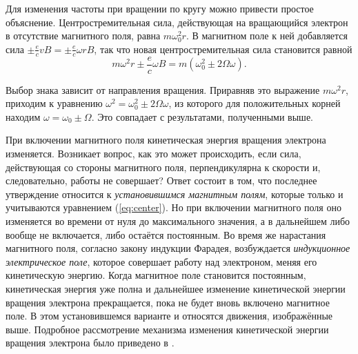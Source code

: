 \documentclass[12pt]{article}
\begin{document}
  Для изменения частоты при вращении по кругу можно привести простое объяснение. Центростремительная сила, действующая на вращающийся электрон в отсутствие магнитного поля, равна $m \omega_0^2 r$. В магнитном поле к ней добавляется сила $\pm \frac{e}{c} v B = \pm \frac{e}{c} \omega r B$, так что новая центростремительная сила становится равной
  \[
  m \omega^2 r \pm \frac{e}{c} \omega B = m (\omega_0^2 \pm 2\Omega \omega).
  \]

  Выбор знака зависит от направления вращения. Приравняв это выражение $m \omega^2 r$, приходим к уравнению $\omega^2 = \omega_0^2 \pm 2\Omega \omega$, из которого для положительных корней находим $\omega = \omega_0 \pm \Omega$. Это совпадает с результатами, полученными выше.

  При включении магнитного поля кинетическая энергия вращения электрона изменяется. Возникает вопрос, как это может происходить, если сила, действующая со стороны магнитного поля, перпендикулярна к скорости и, следовательно, работы не совершает? Ответ состоит в том, что последнее утверждение относится к \textit{установившимся магнитным полям}, которые только и учитываются уравнением (\ref{eq:center}). Но при включении магнитного поля оно изменяется во времени от нуля до максимального значения, а в дальнейшем либо вообще не включается, либо остаётся постоянным. Во время же нарастания магнитного поля, согласно закону индукции Фарадея, возбуждается \textit{индукционное электрическое поле}, которое совершает работу над электроном, меняя его кинетическую энергию. Когда магнитное поле становится постоянным, кинетическая энергия уже полна и дальнейшее изменение кинетической энергии вращения электрона прекращается, пока не будет вновь включено магнитное поле. В этом установившемся варианте и относятся движения, изображённые выше. Подробное рассмотрение механизма изменения кинетической энергии вращения электрона было приведено в
  \cite[\S 88]{sivykhin3}.
\end{document}
